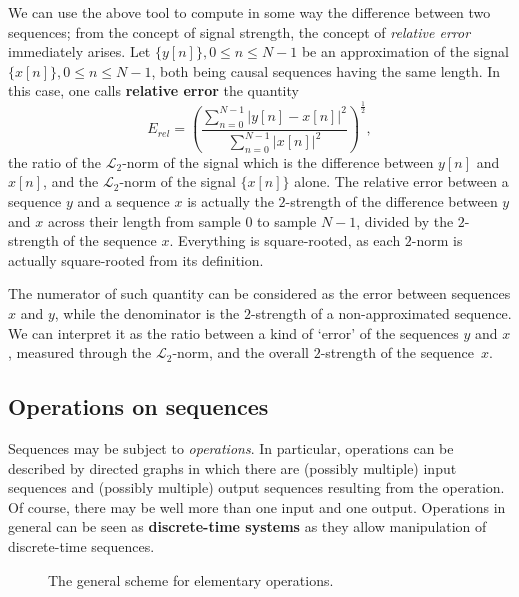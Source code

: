 \documentclass[\documentfontsize, twocolumn]{\classname}
\begin{document}
We can use the above tool to compute in some way the difference between two sequences; from the concept of signal strength, the concept of \emph{relative error} immediately arises.
Let $\{y[n]\}, 0 \leq n \leq N - 1$ be an approximation of the signal $\{x[n]\}, 0 \leq n \leq N - 1$, both being causal sequences having the same length.
In this case, one calls \textbf{relative error} the quantity
\begin{equation}\label{eqn:RelativeError}
	E_{rel} = \left(\frac{\sum_{n=0}^{N-1} |y[n] - x[n]|^2}{\sum_{n=0}^{N-1} |x[n]|^2}\right)^\frac{1}{2},
\end{equation}
the ratio of the $\mathcal L_2$-norm of the signal which is the difference between $y[n]$ and $x[n]$, and the $\mathcal L_2$-norm of the signal $\{x[n]\}$ alone. The relative error between a sequence $y$ and a sequence $x$ is actually the $2$-strength of the difference between $y$ and $x$ across their length from sample $0$ to sample $N-1$, divided by the $2$-strength of the sequence $x$. Everything is square-rooted, as each $2$-norm is actually square-rooted from its definition.

The numerator of such quantity can be considered as the error between se\-quen\-ces $x$ and $y$, while the denominator is the $2$-strength of a non-approximated se\-quen\-ce. We can interpret it as the ratio between a kind of `error' of the sequences $y$ and $x$, measured through the $\mathcal L_2$-norm, and the overall $2$-strength of the sequence~$x$.

\subsection{Operations on se\-quen\-ces}\label{sec:operationsOnSequences}

Se\-quen\-ces may be subject to \emph{operations}. In particular, operations can be described by directed graphs in which there are (possibly multiple) input se\-quen\-ces and (possibly multiple) output se\-quen\-ces resulting from the operation. Of course, there may be well more than one input and one output. Operations in general can be seen as \textbf{discrete-time systems} as they allow manipulation of discrete-time sequences.

    \begin{figure}[ht]
\begin{center}
\caption{The general scheme for elementary operations.}\label{tikz:operation-scheme}
\end{center}
\end{figure}
\end{document}
